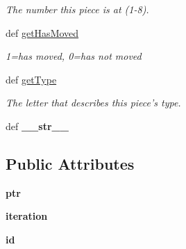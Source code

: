 \begin{DoxyCompactItemize}
\begin{DoxyCompactList}\small\item\em The number this piece is at (1-\/8). \item\end{DoxyCompactList}\item 
\hypertarget{classGameObject_1_1Piece_a3ddf1a9b0feb735b4c6d6133f3f935e7}{
def \hyperlink{classGameObject_1_1Piece_a3ddf1a9b0feb735b4c6d6133f3f935e7}{getHasMoved}}
\label{classGameObject_1_1Piece_a3ddf1a9b0feb735b4c6d6133f3f935e7}

\begin{DoxyCompactList}\small\item\em 1=has moved, 0=has not moved \item\end{DoxyCompactList}\item 
def \hyperlink{classGameObject_1_1Piece_aada307c3b0bd9830613b8ef70c6eebc3}{getType}
\begin{DoxyCompactList}\small\item\em The letter that describes this piece's type. \item\end{DoxyCompactList}\item 
\hypertarget{classGameObject_1_1Piece_ac535f7b06749009aac49367528b7d746}{
def {\bfseries \_\-\_\-str\_\-\_\-}}
\label{classGameObject_1_1Piece_ac535f7b06749009aac49367528b7d746}

\end{DoxyCompactItemize}
\subsection*{Public Attributes}
\begin{DoxyCompactItemize}
\item 
\hypertarget{classGameObject_1_1Piece_a7e8c2348f727cf54c4332364997e0186}{
{\bfseries ptr}}
\label{classGameObject_1_1Piece_a7e8c2348f727cf54c4332364997e0186}

\item 
\hypertarget{classGameObject_1_1Piece_a41bd4f862bda543aed6462ad17a13758}{
{\bfseries iteration}}
\label{classGameObject_1_1Piece_a41bd4f862bda543aed6462ad17a13758}

\item 
\hypertarget{classGameObject_1_1Piece_a05d8f7aff1663c0bd46f201cae3f7070}{
{\bfseries id}}
\label{classGameObject_1_1Piece_a05d8f7aff1663c0bd46f201cae3f7070}

\end{DoxyCompactItemize}


